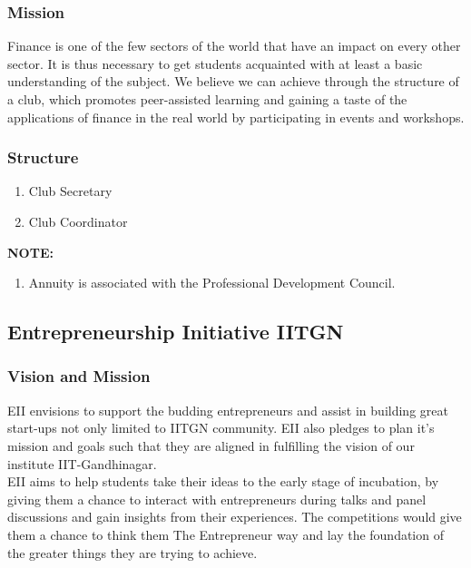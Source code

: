 \documentclass[12pt]{article}
\begin{document}
\subsubsection{Mission}
Finance is one of the few sectors of the world that have an impact on every other sector. It is thus necessary to get students acquainted with at least a basic understanding of the subject. We believe we can achieve through the structure of a club, which promotes peer-assisted learning and gaining a taste of the applications of finance in the real world by participating in events and workshops.

\subsubsection{Structure}
\begin{enumerate}
    \item Club Secretary
    \item Club Coordinator
\end{enumerate}

\noindent \textbf{NOTE:} \begin{enumerate}
    \item Annuity is associated with the Professional Development Council.
\end{enumerate}

\subsection{Entrepreneurship Initiative IITGN}
\subsubsection{Vision and Mission}
EII envisions to support the budding entrepreneurs and assist in building great start-ups not only limited to IITGN community. EII also pledges to plan it’s mission and goals such that they are aligned in fulfilling the vision of our institute IIT-Gandhinagar.\\

\noindent EII aims to help students take their ideas to the early stage of incubation, by giving them a chance to interact with entrepreneurs during talks and panel discussions and gain insights from their experiences. The competitions would give them a chance to think them The Entrepreneur way and lay the foundation of the greater things they are trying to achieve.
\end{document}
